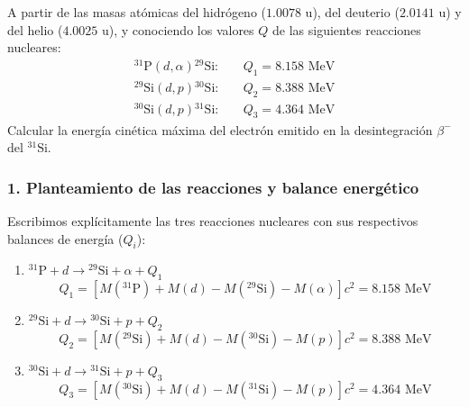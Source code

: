 \begin{problema}
A partir de las masas atómicas del hidrógeno ($1.0078\text{ u}$), del deuterio ($2.0141\text{ u}$) y del helio ($4.0025\text{ u}$), y conociendo los valores $Q$ de las siguientes reacciones nucleares:
\begin{align}
{}^{31}\text{P}(d,\alpha){}^{29}\text{Si}: & \quad Q_1 = 8.158\text{ MeV} \\
{}^{29}\text{Si}(d,p){}^{30}\text{Si}: & \quad Q_2 = 8.388\text{ MeV} \\
{}^{30}\text{Si}(d,p){}^{31}\text{Si}: & \quad Q_3 = 4.364\text{ MeV}
\end{align}
Calcular la energía cinética máxima del electrón emitido en la desintegración $\beta^-$ del ${}^{31}\text{Si}$.

\tcblower

\subsubsection*{1. Planteamiento de las reacciones y balance energético}

Escribimos explícitamente las tres reacciones nucleares con sus respectivos balances de energía ($Q_i$):
\begin{enumerate}[label=\arabic*)]
    \item ${}^{31}\text{P} + d \longrightarrow {}^{29}\text{Si} + \alpha + Q_1$
    \begin{equation}
    Q_1 = \left[ M({}^{31}\text{P}) + M(d) - M({}^{29}\text{Si}) - M(\alpha) \right] c^2 = 8.158\text{ MeV}
    \end{equation}

    \item ${}^{29}\text{Si} + d \longrightarrow {}^{30}\text{Si} + p + Q_2$
    \begin{equation}
    Q_2 = \left[ M({}^{29}\text{Si}) + M(d) - M({}^{30}\text{Si}) - M(p) \right] c^2 = 8.388\text{ MeV}
    \end{equation}

    \item ${}^{30}\text{Si} + d \longrightarrow {}^{31}\text{Si} + p + Q_3$
    \begin{equation}
    Q_3 = \left[ M({}^{30}\text{Si}) + M(d) - M({}^{31}\text{Si}) - M(p) \right] c^2 = 4.364\text{ MeV}
    \end{equation}
\end{enumerate}


\end{problema}
